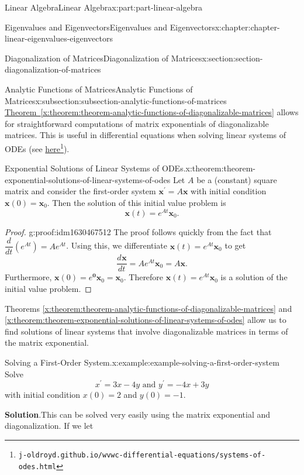 \documentclass[twoside,10pt,]{book}
\newcommand{\blocktitlefont}{\relax}
\newcommand{\xreffont}{\relax}
\numberwithin{equation}{part}
\providecommand{\vb}[1]{\mathbf{#1}}
\newcommand{\xx}{\mathbf{x}}
\providecommand{\dv}[3][]{\dfrac{d^{#1} #2}{d #3^{#1}}}
\begin{document}
\begin{partptx}{Linear Algebra}{}{Linear Algebra}{}{}{x:part:part-linear-algebra}
\begin{chapterptx}{Eigenvalues and Eigenvectors}{}{Eigenvalues and Eigenvectors}{}{}{x:chapter:chapter-linear-eigenvalues-eigenvectors}
\begin{sectionptx}{Diagonalization of Matrices}{}{Diagonalization of Matrices}{}{}{x:section:section-diagonalization-of-matrices}
\begin{subsectionptx}{Analytic Functions of Matrices}{}{Analytic Functions of Matrices}{}{}{x:subsection:subsection-analytic-functions-of-matrices}
\hyperref[x:theorem:theorem-analytic-functions-of-diagonalizable-matrices]{Theorem~{\xreffont\ref{x:theorem:theorem-analytic-functions-of-diagonalizable-matrices}}} allows for straightforward computations of matrix exponentials of diagonalizable matrices. This is useful in differential equations when solving linear systems of ODEs (see \href{https://j-oldroyd.github.io/wvwc-differential-equations/systems-of-odes.html}{here}\footnote{\nolinkurl{j-oldroyd.github.io/wvwc-differential-equations/systems-of-odes.html}\label{g:fn:idm1630462264}}).%
\begin{theorem}{Exponential Solutions of Linear Systems of ODEs.}{}{x:theorem:theorem-exponential-solutions-of-linear-systems-of-odes}%
Let \(A\) be a (constant) square matrix and consider the first-order system \(\xx^\prime = A\xx\) with initial condition \(\xx(0) = \xx_0\). Then the solution of this initial value problem is%
\begin{equation*}
\xx(t) = e^{At}\xx_0\text{.}
\end{equation*}
%
\end{theorem}
\begin{proof}{}{g:proof:idm1630467512}
The proof follows quickly from the fact that \(\dv{}{t}(e^{At}) = Ae^{At}\). Using this, we differentiate \(\xx(t) = e^{At}\xx_0\) to get%
\begin{equation*}
\dv{\xx}{t} = Ae^{At}\xx_0 = A\xx\text{.}
\end{equation*}
Furthermore, \(\xx(0) = e^{\vb{0}}\xx_0 = \xx_0\). Therefore \(\xx(t) = e^{At}\xx_0\) is a solution of the initial value problem.%
\end{proof}
Theorems \hyperref[x:theorem:theorem-analytic-functions-of-diagonalizable-matrices]{{\xreffont\ref{x:theorem:theorem-analytic-functions-of-diagonalizable-matrices}}} and \hyperref[x:theorem:theorem-exponential-solutions-of-linear-systems-of-odes]{{\xreffont\ref{x:theorem:theorem-exponential-solutions-of-linear-systems-of-odes}}} allow us to find solutions of linear systems that involve diagonalizable matrices in terms of the matrix exponential.%
\begin{example}{Solving a First-Order System.}{x:example:example-solving-a-first-order-system}%
Solve%
\begin{equation*}
x^\prime = 3x - 4y \text{ and } y^\prime = -4x + 3y
\end{equation*}
with initial condition \(x(0) = 2\) and \(y(0) = -1\).%
\par\smallskip%
\noindent\textbf{\blocktitlefont Solution}.\hypertarget{g:solution:idm1630457656}{}\quad{}This can be solved very easily using the matrix exponential and diagonalization. If we let%

\end{example}
\end{subsectionptx}
\end{sectionptx}
\end{chapterptx}
\end{partptx}
\end{document}
